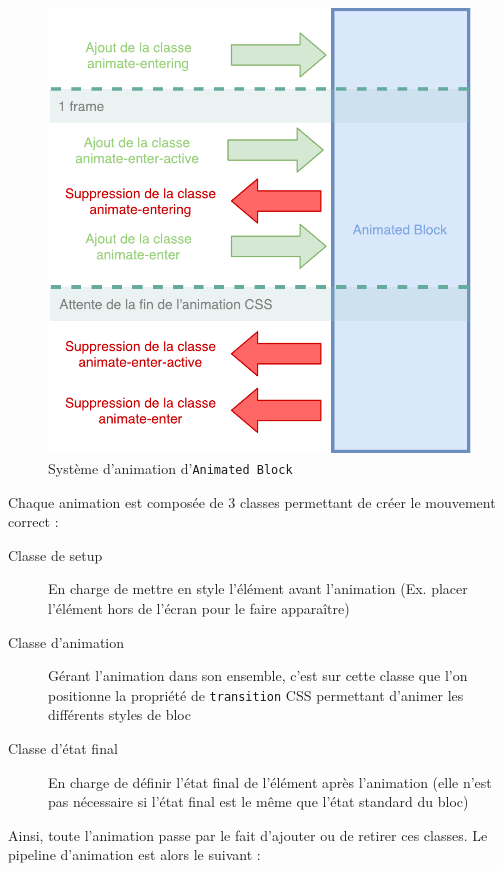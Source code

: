 \begin{figure}[h]
    \centering
    \includegraphics[scale=0.5]{img/animated-block.pdf}
    \caption{Système d'animation d'\texttt{Animated Block}}
\end{figure}

Chaque animation est composée de 3 classes permettant de créer le mouvement correct :

\begin{description}
    \item[Classe de setup] En charge de mettre en style l'élément avant l'animation (Ex. placer l'élément hors de l'écran pour le faire apparaître)
    \item[Classe d'animation] Gérant l'animation dans son ensemble, c'est sur cette classe que l'on positionne la propriété de \texttt{transition} CSS permettant d'animer les différents styles de bloc
    \item[Classe d'état final] En charge de définir l'état final de l'élément après l'animation (elle n'est pas nécessaire si l'état final est le même que l'état standard du bloc)
\end{description}

Ainsi, toute l'animation passe par le fait d'ajouter ou de retirer ces classes.
Le pipeline d'animation est alors le suivant :

